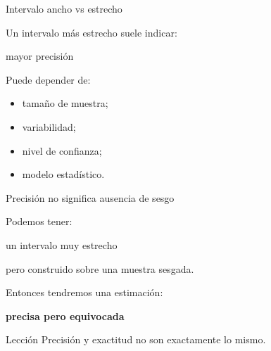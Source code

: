 \documentclass[aspectratio=169,11pt]{beamer}
\begin{document}

\begin{frame}{Intervalo ancho vs estrecho}

Un intervalo más estrecho suele indicar:

\begin{center}

\Large
mayor precisión

\end{center}

Puede depender de:

\begin{itemize}

    \item tamaño de muestra;

    \item variabilidad;

    \item nivel de confianza;

    \item modelo estadístico.

\end{itemize}

\end{frame}


\begin{frame}{Precisión no significa ausencia de sesgo}

Podemos tener:

\begin{center}

\Large
un intervalo muy estrecho
\end{center}

pero construido sobre una muestra sesgada.

\vspace{0.5cm}

Entonces tendremos una estimación:

\begin{center}

\Large
\textbf{precisa pero equivocada}
\end{center}

\vspace{0.4cm}

\begin{alertblock}{Lección}
Precisión y exactitud no son exactamente lo mismo.
\end{alertblock}

\end{frame}
\end{document}
